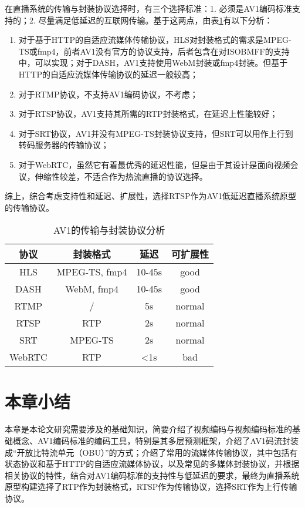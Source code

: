 在直播系统的传输与封装协议选择时，有三个选择标准：1. 必须是AV1编码标准支持的；2. 尽量满足低延迟的互联网传输。基于这两点，由表\ref{tab:protocol}有以下分析：

\begin{enumerate} [label=\arabic*)]
  \item 对于基于HTTP的自适应流媒体传输协议，HLS对封装格式的需求是MPEG-TS或fmp4，前者AV1没有官方的协议支持，后者包含在对ISOBMFF的支持中，可以实现；对于DASH，AV1支持使用WebM封装或fmp4封装。但基于HTTP的自适应流媒体传输协议的延迟一般较高；
  \item 对于RTMP协议，不支持AV1编码协议，不考虑；
  \item 对于RTSP协议，AV1支持其所需的RTP封装格式，在延迟上性能较好；
  \item 对于SRT协议，AV1并没有MPEG-TS封装协议支持，但SRT可以用作上行到转码服务器的传输协议；
  \item 对于WebRTC，虽然它有着最优秀的延迟性能，但是由于其设计是面向视频会议，伸缩性较差，不适合作为热流直播的协议选择。
\end{enumerate}

综上，综合考虑支持性和延迟、扩展性，选择RTSP作为AV1低延迟直播系统原型的传输协议。

\begin{table}[!hpt]
  \caption{AV1的传输与封装协议分析}
  \label{tab:protocol}
  \centering
  \begin{tabular}{cccc} \toprule
    协议     & 封装格式       & 延迟     & 可扩展性\\ \midrule
    HLS     & MPEG-TS, fmp4 & 10-45s  & good  \\
    DASH    & WebM, fmp4    & 10-45s  & good  \\
    RTMP    & /             & 5s      & normal \\
    RTSP    & RTP           & 2s      & normal \\
    SRT     & MPEG-TS       & 2s      & normal \\
    WebRTC  & RTP           & <1s     & bad    \\ \bottomrule
  \end{tabular}
\end{table}




\section{本章小结}

本章是本论文研究需要涉及的基础知识，简要介绍了视频编码与视频编码标准的基础概念、AV1编码标准的编码工具，特别是其多层预测框架，介绍了AV1码流封装成“开放比特流单元（OBU）”的方式；介绍了常用的流媒体传输协议，其中包括有状态协议和基于HTTP的自适应流媒体协议，以及常见的多媒体封装协议，并根据相关协议的特性，结合对AV1编码标准的支持性与低延迟的要求，最终为直播系统原型构建选择了RTP作为封装格式，RTSP作为传输协议，选择SRT作为上行传输协议。